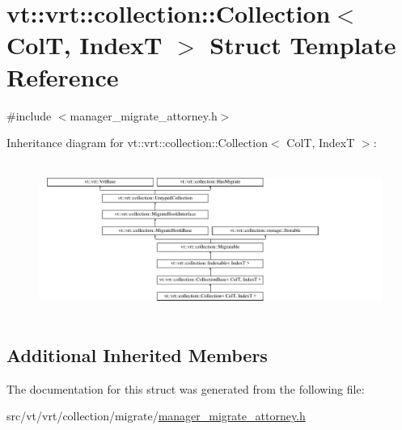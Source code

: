 \hypertarget{structvt_1_1vrt_1_1collection_1_1_collection}{}\section{vt\+:\+:vrt\+:\+:collection\+:\+:Collection$<$ ColT, IndexT $>$ Struct Template Reference}
\label{structvt_1_1vrt_1_1collection_1_1_collection}


{\ttfamily \#include $<$manager\+\_\+migrate\+\_\+attorney.\+h$>$}

Inheritance diagram for vt\+:\+:vrt\+:\+:collection\+:\+:Collection$<$ ColT, IndexT $>$\+:\begin{figure}[H]
\begin{center}
\leavevmode
\includegraphics[height=5.028059cm]{structvt_1_1vrt_1_1collection_1_1_collection}
\end{center}
\end{figure}
\subsection*{Additional Inherited Members}


The documentation for this struct was generated from the following file\+:\begin{DoxyCompactItemize}
\item 
src/vt/vrt/collection/migrate/\hyperlink{manager__migrate__attorney_8h}{manager\+\_\+migrate\+\_\+attorney.\+h}\end{DoxyCompactItemize}
